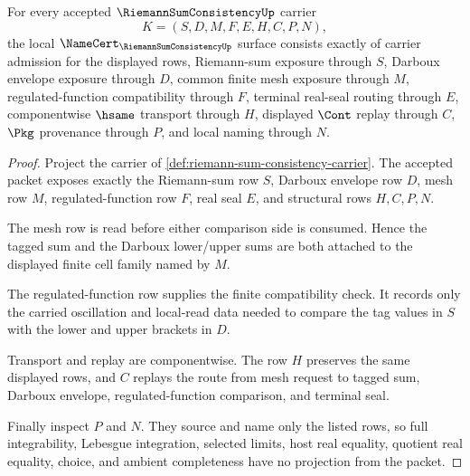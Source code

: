 \begin{theorem}
\label{thm:riemann-sum-consistency-namecert-obligations}
For every accepted $\RiemannSumConsistencyUp$ carrier
$$
K=(S,D,M,F,E,H,C,P,N),
$$
the local $\NameCert_{\RiemannSumConsistencyUp}$ surface consists exactly of carrier admission for the displayed rows, Riemann-sum exposure through $S$, Darboux envelope exposure through $D$, common finite mesh exposure through $M$, regulated-function compatibility through $F$, terminal real-seal routing through $E$, componentwise $\hsame$ transport through $H$, displayed $\Cont$ replay through $C$, $\Pkg$ provenance through $P$, and local naming through $N$.
\end{theorem}
\begin{proof}
Project the carrier of \autoref{def:riemann-sum-consistency-carrier}. The accepted packet exposes exactly the Riemann-sum row $S$, Darboux envelope row $D$, mesh row $M$, regulated-function row $F$, real seal $E$, and structural rows $H,C,P,N$.

The mesh row is read before either comparison side is consumed. Hence the tagged sum and the Darboux lower/upper sums are both attached to the displayed finite cell family named by $M$.

The regulated-function row supplies the finite compatibility check. It records only the carried oscillation and local-read data needed to compare the tag values in $S$ with the lower and upper brackets in $D$.

Transport and replay are componentwise. The row $H$ preserves the same displayed rows, and $C$ replays the route from mesh request to tagged sum, Darboux envelope, regulated-function comparison, and terminal seal.

Finally inspect $P$ and $N$. They source and name only the listed rows, so full integrability, Lebesgue integration, selected limits, host real equality, quotient real equality, choice, and ambient completeness have no projection from the packet.
\end{proof}

